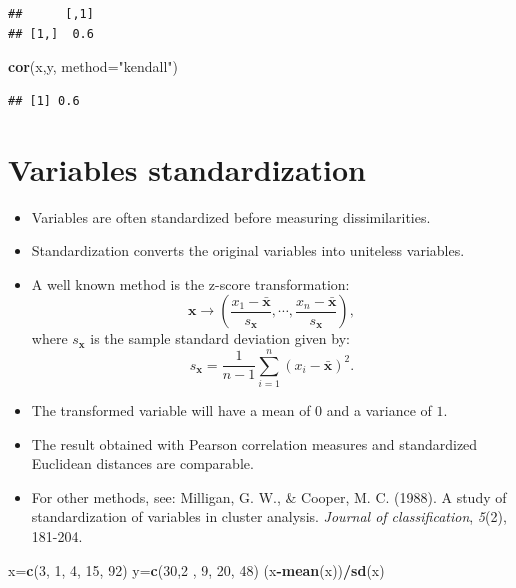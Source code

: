 \documentclass[
]{article}
\newenvironment{Shaded}{\begin{snugshade}}{\end{snugshade}}
\newcommand{\DataTypeTok}[1]{\textcolor[rgb]{0.13,0.29,0.53}{#1}}
\newcommand{\DecValTok}[1]{\textcolor[rgb]{0.00,0.00,0.81}{#1}}
\newcommand{\KeywordTok}[1]{\textcolor[rgb]{0.13,0.29,0.53}{\textbf{#1}}}
\newcommand{\NormalTok}[1]{#1}
\newcommand{\OperatorTok}[1]{\textcolor[rgb]{0.81,0.36,0.00}{\textbf{#1}}}
\newcommand{\StringTok}[1]{\textcolor[rgb]{0.31,0.60,0.02}{#1}}
\providecommand{\tightlist}{%
  \setlength{\itemsep}{0pt}\setlength{\parskip}{0pt}}
\begin{document}
\begin{verbatim}
##      [,1]
## [1,]  0.6
\end{verbatim}

\begin{Shaded}
\begin{Highlighting}[]
\KeywordTok{cor}\NormalTok{(x,y, }\DataTypeTok{method=}\StringTok{"kendall"}\NormalTok{)}
\end{Highlighting}
\end{Shaded}

\begin{verbatim}
## [1] 0.6
\end{verbatim}

\hypertarget{variables-standardization}{%
\section{Variables standardization}\label{variables-standardization}}

\begin{itemize}
\tightlist
\item
  Variables are often standardized before measuring dissimilarities.
\item
  Standardization converts the original variables into uniteless
  variables.
\item
  A well known method is the z-score transformation: \[
  \mathbf{x}\rightarrow (\frac{x_1-\bar{\mathbf{x}}}{s_\mathbf{x}},\cdots,\frac{x_n-\bar{\mathbf{x}}}{s_\mathbf{x}}),
  \] where \(s_\mathbf{x}\) is the sample standard deviation given by:
  \[
  s_\mathbf{x}=\frac{1}{n-1}\sum_{i=1}^n(x_i-\bar{\mathbf{x}})^2.
  \]
\item
  The transformed variable will have a mean of \(0\) and a variance of
  \(1\).
\item
  The result obtained with Pearson correlation measures and standardized
  Euclidean distances are comparable.
\item
  For other methods, see: Milligan, G. W., \& Cooper, M. C. (1988). A
  study of standardization of variables in cluster analysis.
  \emph{Journal of classification}, \emph{5}(2), 181-204.
\end{itemize}

\begin{Shaded}
\begin{Highlighting}[]
\NormalTok{x=}\KeywordTok{c}\NormalTok{(}\DecValTok{3}\NormalTok{, }\DecValTok{1}\NormalTok{, }\DecValTok{4}\NormalTok{, }\DecValTok{15}\NormalTok{, }\DecValTok{92}\NormalTok{)}
\NormalTok{y=}\KeywordTok{c}\NormalTok{(}\DecValTok{30}\NormalTok{,}\DecValTok{2}\NormalTok{ , }\DecValTok{9}\NormalTok{, }\DecValTok{20}\NormalTok{, }\DecValTok{48}\NormalTok{)}
\NormalTok{(x}\OperatorTok{-}\KeywordTok{mean}\NormalTok{(x))}\OperatorTok{/}\KeywordTok{sd}\NormalTok{(x)}
\end{Highlighting}
\end{Shaded}
\end{document}
